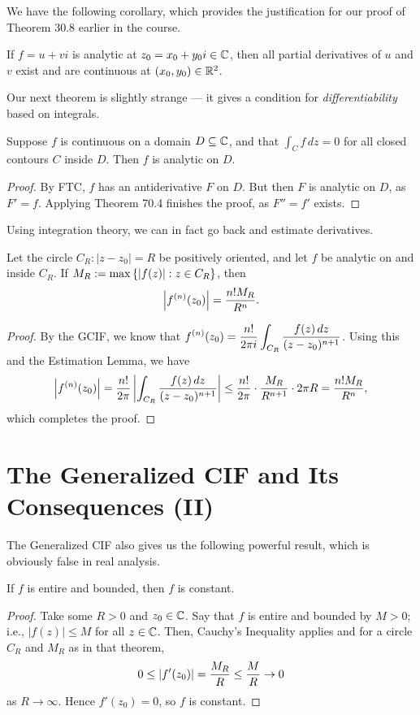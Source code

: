 \documentclass{article}
\begin{document}
We have the following corollary, which provides the justification for our proof of Theorem 30.8 earlier in the course.
\begin{corollary}
If $f = u+vi$ is analytic at $z_0 = x_0 + y_0i\in\mathbb C$, then all partial derivatives of $u$ and $v$ exist and are continuous at $(x_0, y_0)\in \mathbb R^2$.
\end{corollary}

Our next theorem is slightly strange --- it gives a condition for \textit{differentiability} based on integrals.

\begin{theorem}
Suppose $f$ is continuous on a domain $D\subseteq \mathbb C$, and that $\int_C f\, dz = 0$ for all closed contours $C$ inside $D$. Then $f$ is analytic on $D$.
\end{theorem}
\begin{proof}
By FTC, $f$ has an antiderivative $F$ on $D$. But then $F$ is analytic on $D$, as $F' = f$. Applying Theorem 70.4 finishes the proof, as $F'' = f'$ exists.
\end{proof}

Using integration theory, we can in fact go back and estimate derivatives.
\begin{theorem}
Let the circle $C_R: |z-z_0|=R$ be positively oriented, and let $f$ be analytic on and inside $C_R$. If $M_R := \max\left\{|f(z)|: z\in C_R\right\}$, then
$$\left|f^{(n)}(z_0)\right| = \frac{n!M_R}{R^n}.$$
\end{theorem}
\begin{proof}
By the GCIF, we know that $\displaystyle f^{(n)}(z_0) = \frac{n!}{2\pi i}\int_{C_R} \frac{f(z)\, dz}{(z-z_0)^{n+1}}$. Using this and the Estimation Lemma, we have
$$\left|f^{(n)}(z_0)\right| = \frac{n!}{2\pi}\left| \int_{C_R} \frac{f(z)\, dz}{(z-z_0)^{n+1}}\right| \leq \frac{n!}{2\pi} \cdot \frac{M_R}{R^{n+1}} \cdot 2\pi R = \frac{n!M_R}{R^n},$$
which completes the proof.
\end{proof}

\setcounter{section}{73}
\section{The Generalized CIF and Its Consequences (II)}
The Generalized CIF also gives us the following powerful result, which is obviously false in real analysis.
\begin{theorem}
If $f$ is entire and bounded, then $f$ is constant.
\end{theorem}
\begin{proof}
Take some $R>0$ and $z_0\in\mathbb C$. Say that $f$ is entire and bounded by $M>0$; i.e., $|f(z)| \leq M$ for all $z\in\mathbb C$. Then, Cauchy's Inequality applies and for a circle $C_R$ and $M_R$ as in that theorem,
$$0\leq \left|f'(z_0)\right| = \frac{M_R}R \leq \frac MR \to 0$$
as $R\to \infty$. Hence $f'(z_0) = 0$, so $f$ is constant.
\end{proof}
\end{document}
